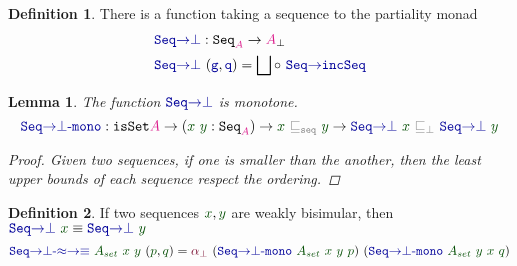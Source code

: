 \documentclass[twoside,11pt,openright]{report}
\theoremstyle{plain} %
\newtheorem{lem}[thm]{Lemma}
\theoremstyle{definition}
\newtheorem{defn}{Definition}[section]
\theoremstyle{remark}
\newcommand*{\term}[1]{\textcolor{green!30!black}{#1}} %
\newcommand*{\type}[1]{\textcolor{magenta!90!black}{#1}}
\newcommand*{\relation}[1]{\textcolor{gray}{\ensuremath{\mathtt{#1}}}}
\newcommand*{\function}[1]{\textcolor{blue!60!black}{\ensuremath{\mathtt{#1}}}}
\newcommand*{\constructor}[1]{\textcolor{purple!60!black}{\ensuremath{\mathtt{#1}}}}
\newcommand*{\typeformer}[1]{\ensuremath{\mathtt{#1}}}
\begin{document}
\begin{defn}
  There is a function taking a sequence to the partiality monad
  \begin{equation}
    \begin{aligned}
      &\function{Seq{\rightarrow}\bot} : \typeformer{Seq}_{\type{A}} \rightarrow \type{A}_{\bot} \\
      &\function{Seq{\rightarrow}\bot}~(\function{g},\function{q}) = \bigsqcup \circ~\function{Seq{\rightarrow}incSeq}
    \end{aligned}
  \end{equation}
\end{defn}
\begin{lem}
  The function \(\function{Seq{\rightarrow}\bot}\) is monotone. 
  \begin{equation}
    \function{Seq{\rightarrow}\bot\text{-}mono} : \typeformer{isSet} \type{A} \rightarrow (\term{x}~\term{y} : \typeformer{Seq}_{\type{A}}) \rightarrow \term{x}~\relation{\sqsubseteq_{seq}}~\term{y} \rightarrow \function{Seq{\rightarrow}\bot}~\term{x}~\relation{\sqsubseteq_{\bot}}~\function{Seq{\rightarrow}\bot}~\term{y}
\end{equation}
  \begin{proof}
    Given two sequences, if one is smaller than the another, then the least upper bounds of each sequence respect the ordering. 
  \end{proof}
\end{lem}
\begin{defn}
  If two sequences \(\term{x},\term{y}\) are weakly bisimular, then \(\function{Seq{\rightarrow}\bot}~\term{x} \equiv \function{Seq{\rightarrow}\bot}~\term{y}\)
\begin{equation}
  \function{Seq{\rightarrow}\bot\text{-}{\approx}{\rightarrow}{\equiv}}~\term{A_{set}}~\term{x}~\term{y}~(\term{p} , \term{q}) = \constructor{\alpha_{\bot}}~(\function{Seq{\rightarrow}\bot\text{-}mono}~\term{A_{set}}~\term{x}~\term{y}~\term{p})~(\function{Seq{\rightarrow}\bot\text{-}mono}~\term{A_{set}}~\term{y}~\term{x}~\term{q})
\end{equation}
\end{defn}
\end{document}
